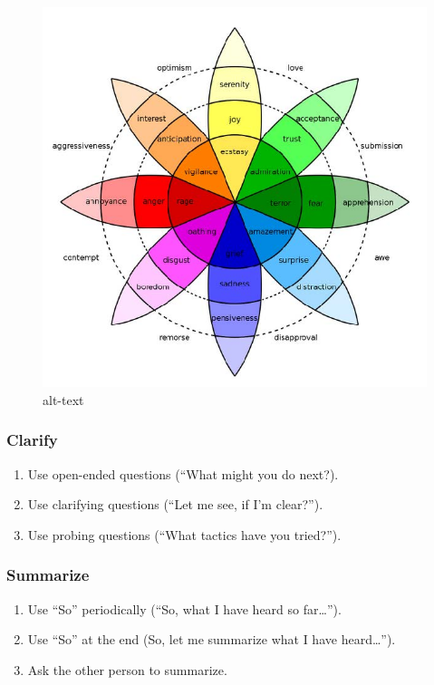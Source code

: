 \documentclass[
]{book}
\providecommand{\tightlist}{%
  \setlength{\itemsep}{0pt}\setlength{\parskip}{0pt}}
\begin{document}
\begin{figure}
\centering
\includegraphics{assets/presentations/coaching/plutchik.jpg}
\caption{alt-text}
\end{figure}

\hypertarget{clarify}{%
\subsubsection*{Clarify}\label{clarify}}

\begin{enumerate}
\def\labelenumi{\arabic{enumi}.}
\tightlist
\item
  Use open-ended questions (``What might you do next?).
\item
  Use clarifying questions (``Let me see, if I'm clear?'').
\item
  Use probing questions (``What tactics have you tried?'').
\end{enumerate}

\hypertarget{summarize}{%
\subsubsection*{Summarize}\label{summarize}}

\begin{enumerate}
\def\labelenumi{\arabic{enumi}.}
\tightlist
\item
  Use ``So'' periodically (``So, what I have heard so far\ldots{}'').
\item
  Use ``So'' at the end (So, let me summarize what I have heard\ldots'').
\item
  Ask the other person to summarize.
\end{enumerate}
\end{document}
